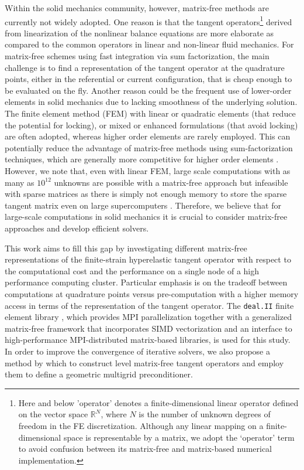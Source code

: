 \documentclass[AMA,STIX1COL]{WileyNJD-v2}
\begin{document}
Within the solid mechanics community, however, matrix-free methods are currently not widely adopted.
One reason is that the tangent operators\footnote{Here and
below 'operator' denotes a finite-dimensional linear operator defined on the vector space $\mathbb R^N$,
where $N$ is the number of unknown degrees of freedom in the FE discretization.
Although any linear mapping on a finite-dimensional space is representable by a matrix, we adopt the `operator' term to avoid confusion between its matrix-free and matrix-based numerical implementation.
} derived from linearization of the nonlinear balance equations are
more elaborate as compared to the common operators in linear and non-linear fluid mechanics.
For matrix-free schemes using fast integration via sum factorization, the main challenge is to find a representation of the tangent operator
at the quadrature points,
either in the referential or current configuration,
that is cheap enough to be evaluated on the fly.
Another reason could be the frequent use of lower-order elements in solid mechanics due to lacking smoothness of the underlying solution.
The finite element method (FEM) with linear or quadratic elements (that reduce the potential for locking),
or mixed or enhanced formulations (that avoid locking) are often adopted,
whereas higher order elements are rarely employed.
This can potentially reduce the advantage of matrix-free methods using sum-factorization techniques,
which are generally more competitive for higher order elements \cite{kronbichler12,kronbichler2017fast,muthing2017high,Fischer2019}.
However, we note that, even with linear FEM, large scale computations with as many as $10^{12}$ unknowns are possible with a matrix-free approach
but infeasible with sparse matrices as there is simply not enough memory to store the sparse tangent matrix even on large supercomputers \cite{Gmeiner2016}.
Therefore, we believe that for large-scale computations in solid mechanics it is crucial to consider matrix-free approaches and develop efficient solvers.

This work aims to fill this gap by investigating different matrix-free representations of the
finite-strain hyperelastic tangent operator with respect to the computational cost
and the performance on a single node of a high performance computing cluster.
Particular emphasis is on the tradeoff between computations at quadrature points versus
pre-computation with a higher memory access in terms of the representation of the tangent operator.
The \texttt{deal.II} finite element library \cite{dealII91}, which provides MPI parallelization together with a generalized matrix-free framework
that incorporates SIMD vectorization and an interface to high-performance MPI-distributed matrix-based libraries, is used for this study.
In order to improve the convergence of iterative solvers, we also propose a method by which to construct level matrix-free tangent operators
and employ them to define a \mbox{geometric} multigrid preconditioner.
\end{document}
